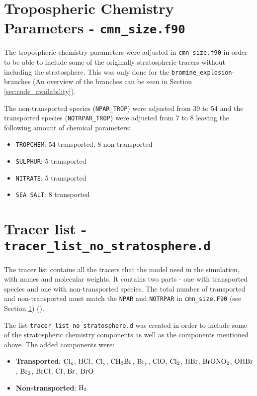 \section{Tropospheric Chemistry Parameters - \texttt{cmn\_size.f90}}\label{subsubsec:cmn_size}


The tropospheric chemistry parameters were adjusted in \texttt{cmn\_size.f90} in order to be able to include some of the originally stratospheric tracers without including the stratosphere. This was only done for the \texttt{bromine\_explosion}-branches (An overview of the branches can be seen in Section \ref{sec:code_availability}). 

\medskip

The non-transported species (\texttt{NPAR\_TROP}) were adjusted from 39 to 54 and the transported species (\texttt{NOTRPAR\_TROP}) were adjusted from 7 to 8 leaving the following amount of chemical parameters:

\begin{itemize}
    \item \texttt{TROPCHEM}: 54 transported, 8 non-transported
    \item \texttt{SULPHUR}: 5 transported
    \item \texttt{NITRATE}: 5 transported
    \item \texttt{SEA SALT}: 8 transported
\end{itemize}

\section{Tracer list - \texttt{tracer\_list\_no\_stratosphere.d}}\label{subsubsec:tracer_list}

The tracer list contains all the tracers that the model need in the simulation, with names and molecular weights. It contains two parts - one with transported species and one with non-transported species. The total number of transported and non-transported must match the \texttt{NPAR} and \texttt{NOTRPAR} in \texttt{cmn\_size.F90} (see Section \ref{subsubsec:cmn_size}) (\cite{SovdeManual}). 

\medskip

The list \texttt{tracer\_list\_no\_stratosphere.d} was created in order to include some of the stratospheric chemistry components as well as the components mentioned above. The added components were: 

\begin{itemize}
    \item \textbf{Transported}: $\mathrm{Cl_x}$, $\mathrm{HCl}$, $\mathrm{Cl_y}$, $\mathrm{CH_3Br}$, $\mathrm{Br_y}$, $\mathrm{ClO}$, $\mathrm{Cl_2}$, $\mathrm{HBr}$, $\mathrm{BrONO_2}$, $\mathrm{OHBr}$, $\mathrm{Br_2}$, $\mathrm{BrCl}$, $\mathrm{Cl}$, $\mathrm{Br}$, $\mathrm{BrO}$
    \item \textbf{Non-transported}: $\mathrm{H_2}$
\end{itemize}

